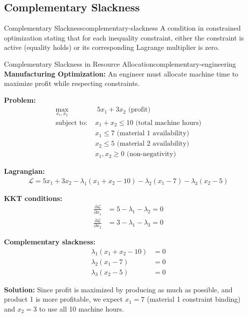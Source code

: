 \documentclass[12pt]{article}
\begin{document}
\subsection{Complementary Slackness}

\begin{definition}{Complementary Slackness}{complementary-slackness}
A condition in constrained optimization stating that for each inequality constraint, either the constraint is active (equality holds) or its corresponding Lagrange multiplier is zero.
\end{definition}

\begin{example}{Complementary Slackness in Resource Allocation}{complementary-engineering}
\textbf{Manufacturing Optimization:} An engineer must allocate machine time to maximize profit while respecting constraints.

\textbf{Problem:}
\begin{align}
\max_{x_1, x_2} &\; 5x_1 + 3x_2 \text{ (profit)} \\
\text{subject to: } &x_1 + x_2 \leq 10 \text{ (total machine hours)} \\
&x_1 \leq 7 \text{ (material 1 availability)} \\
&x_2 \leq 5 \text{ (material 2 availability)} \\
&x_1, x_2 \geq 0 \text{ (non-negativity)}
\end{align}

\textbf{Lagrangian:}
\begin{align}
\mathcal{L} = 5x_1 + 3x_2 - \lambda_1(x_1 + x_2 - 10) - \lambda_2(x_1 - 7) - \lambda_3(x_2 - 5)
\end{align}

\textbf{KKT conditions:}
\begin{align}
\frac{\partial \mathcal{L}}{\partial x_1} &= 5 - \lambda_1 - \lambda_2 = 0 \\
\frac{\partial \mathcal{L}}{\partial x_2} &= 3 - \lambda_1 - \lambda_3 = 0
\end{align}

\textbf{Complementary slackness:}
\begin{align}
\lambda_1(x_1 + x_2 - 10) &= 0 \\
\lambda_2(x_1 - 7) &= 0 \\
\lambda_3(x_2 - 5) &= 0
\end{align}

\textbf{Solution:} Since profit is maximized by producing as much as possible, and product 1 is more profitable, we expect $x_1 = 7$ (material 1 constraint binding) and $x_2 = 3$ to use all 10 machine hours.


\end{example}
\end{document}
